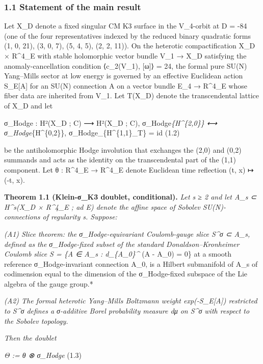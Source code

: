 \documentclass[
 11pt,
 a4paper,
]{article}
\begin{document}
\hypertarget{statement-of-the-main-result}{%
\subsubsection{1.1 Statement of the main result}\label{statement-of-the-main-result}}

Let X\_D denote a fixed singular CM K3 surface in the V\_4-orbit at D = -84 (one of the four representatives indexed by the reduced binary quadratic forms (1, 0, 21), (3, 0, 7), (5, 4, 5), (2, 2, 11)). On the heterotic compactification X\_D × R\^{}4\_E with stable holomorphic vector bundle V\_1 → X\_D satisfying the anomaly-cancellation condition ⟨c\_2(V\_1), {[}ω{]}⟩ = 24, the formal pure SU(N) Yang--Mills sector at low energy is governed by an effective Euclidean action S\_E{[}A{]} for an SU(N) connection A on a vector bundle E\_4 → R\^{}4\_E whose fiber data are inherited from V\_1. Let T(X\_D) denote the transcendental lattice of X\_D and let

σ\_Hodge : H²(X\_D ; C) ⟶ H²(X\_D ; C), σ\_Hodge\textbar{}\emph{\{H\^{}\{2,0\}\} ⟷ σ\_Hodge\textbar{}}\{H\^{}\{0,2\}\}, σ\_Hodge\textbar\_\{H\^{}\{1,1\}\_T\} = id (1.2)

be the antiholomorphic Hodge involution that exchanges the (2,0) and (0,2) summands and acts as the identity on the transcendental part of the (1,1) component. Let θ : R\^{}4\_E → R\^{}4\_E denote Euclidean time reflection (t, x) ↦ (-t, x).

\textbf{Theorem 1.1 (Klein-σ\_K3 doublet, conditional).} \emph{Let s ≥ 2 and let A\_s ⊂ H\^{}s(X\_D × R\^{}4\_E ; ad E) denote the affine space of Sobolev SU(N)-connections of regularity s. Suppose:}

\emph{(A1) Slice theorem: the σ\_Hodge-equivariant Coulomb-gauge slice S\^{}σ ⊂ A\_s, defined as the σ\_Hodge-fixed subset of the standard Donaldson--Kronheimer Coulomb slice S = \{A ∈ A\_s : d\_\{A\_0\}\^{}} (A - A\_0) = 0\} at a smooth reference σ\_Hodge-invariant connection A\_0, is a Hilbert submanifold of A\_s of codimension equal to the dimension of the σ\_Hodge-fixed subspace of the Lie algebra of the gauge group.*

\emph{(A2) The formal heterotic Yang--Mills Boltzmann weight exp(-S\_E{[}A{]}) restricted to S\^{}σ defines a σ-additive Borel probability measure dμ on S\^{}σ with respect to the Sobolev topology.}

\emph{Then the doublet}

\emph{Θ := θ ⊗ σ\_Hodge} (1.3)
\end{document}

